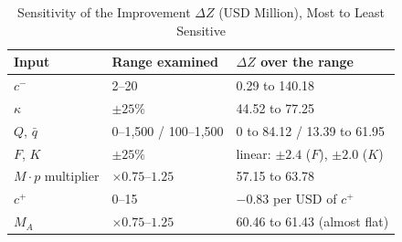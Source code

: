 \documentclass[10pt,a4paper]{article}
\begin{document}
\begin{table}[H]
\centering\small
\caption{Sensitivity of the Improvement $\Delta Z$ (USD Million), Most to Least Sensitive}\label{tab:an-sens-performance}
\begin{tabular}{lP{.22\linewidth}P{.42\linewidth}}
\toprule
Input & Range examined & $\Delta Z$ over the range\\\midrule
$c^-$ & 2--20 & 0.29 to 140.18\\
$\kappa$ & $\pm25\%$ & 44.52 to 77.25\\
$Q$, $\bar q$ & 0--1{,}500 / 100--1{,}500 & 0 to 84.12 / 13.39 to 61.95\\
$F$, $K$ & $\pm25\%$ & linear: $\pm2.4$ ($F$), $\pm2.0$ ($K$)\\
$M\cdot p$ multiplier & $\times0.75$--$1.25$ & 57.15 to 63.78\\
$c^+$ & 0--15 & $-0.83$ per USD of $c^+$\\
$M_A$ & $\times0.75$--$1.25$ & 60.46 to 61.43 (almost flat)\\
\bottomrule
\end{tabular}
\end{table}
\end{document}
